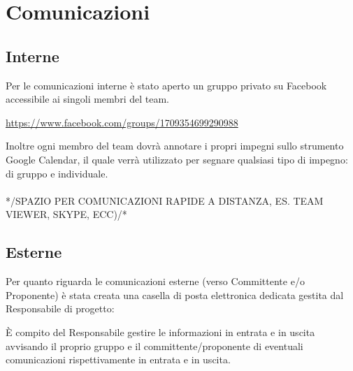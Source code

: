 \section{Comunicazioni}{
	\subsection{Interne}{
		Per le comunicazioni interne è stato aperto un gruppo privato su Facebook accessibile ai singoli membri del team. \begin{center}
			\url{https://www.facebook.com/groups/1709354699290988}
		\end{center} 
		Inoltre ogni membro del team dovrà annotare i propri impegni sullo strumento Google Calendar, il quale verrà utilizzato per segnare qualsiasi tipo di impegno: di gruppo e individuale.\\\\*/SPAZIO PER COMUNICAZIONI RAPIDE A DISTANZA, ES. TEAM VIEWER, SKYPE, ECC)/*
		
	 }
	\subsection{Esterne}{
	Per quanto riguarda le comunicazioni esterne (verso Committente e/o Proponente) è stata creata una casella di posta elettronica dedicata gestita dal Responsabile di progetto: \begin{center}
		\href{mailto:\mail}{\mail} \end{center} È compito del Responsabile gestire le informazioni in entrata e in uscita avvisando il proprio gruppo e il committente/proponente di eventuali comunicazioni rispettivamente in entrata e in uscita.
		}
}